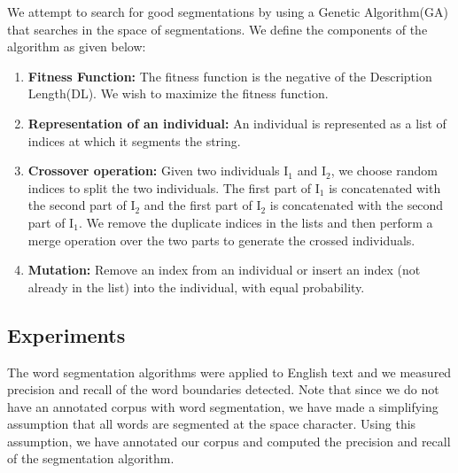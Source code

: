 \documentclass[runningheads]{llncs}
\begin{document}
We attempt to search for good segmentations by using a Genetic Algorithm(GA) that searches in the space of segmentations. We define the components of the algorithm as given below:
\begin{enumerate}
    \item \textbf{Fitness Function:} The fitness function is the negative of the Description Length(DL). We wish to maximize the fitness function.
    \item \textbf{Representation of an individual:} An individual is represented as a list of indices at which it segments the string.
    \item \textbf{Crossover operation:} Given two individuals I$_1$ and I$_2$, we choose random indices to split the two individuals. The first part of I$_1$ is concatenated with the second part of I$_2$ and the first part of I$_2$ is concatenated with the second part of I$_1$. We remove the duplicate indices in the lists and then perform a merge operation over the two parts to generate the crossed individuals.
    \item \textbf{Mutation:} Remove an index from an individual or insert an index (not already in the list) into the individual, with equal probability. 
\end{enumerate}



\subsection{Experiments}

The word segmentation algorithms were applied to English text and we measured precision and recall of the word boundaries detected. Note that since we do not have an annotated corpus with word segmentation, we have made a simplifying assumption that all words are segmented at the space character. Using this assumption, we have annotated our corpus and computed the precision and recall of the segmentation algorithm. 
\end{document}
